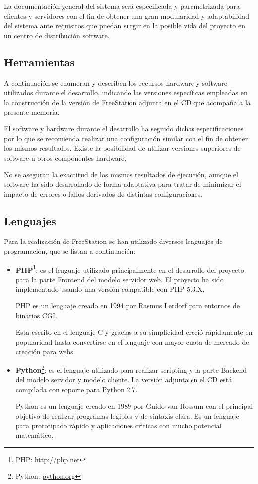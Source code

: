 La documentación general del sistema será especificada y parametrizada para
clientes y servidores con el fin de obtener una gran modularidad y
adaptabilidad del sistema ante requisitos que puedan surgir en la posible vida
del proyecto en un centro de distribución software.

\newpage

\subsection{Herramientas}

A continuación se enumeran y describen los recursos hardware y software
utilizados durante el desarrollo, indicando las versiones específicas
empleadas en la construcción de la versión de FreeStation adjunta en el CD que
acompaña a la presente memoria.

El software y hardware durante el desarrollo ha seguido dichas especificaciones
por lo que se recomienda realizar una configuración similar con el fin de
obtener los mismos resultados. Existe la posibilidad de utilizar versiones
superiores de software u otros componentes hardware.

No se aseguran la exactitud de los mismos resultados de ejecución, aunque el
software ha sido desarrollado de forma adaptativa para tratar de minimizar
el impacto de errores o fallos derivados de distintas configuraciones.

\subsection{Lenguajes}

Para la realización de FreeStation se han utilizado diversos lenguajes de
programación, que se listan a continuación:

\begin{itemize}
\item \textbf{\acs{PHP}\label{acro:PHP}}\footnote{PHP:
\url{http://php.net}\label{ftn:PHP}}:
es el lenguaje utilizado principalmente en el desarrollo del proyecto para la parte Frontend del modelo servidor web.
El proyecto ha sido implementado usando una versión compatible con
PHP 5.3.X.

PHP es un lenguaje creado en 1994 por Rasmus Lerdorf para entornos de
binarios \acs{CGI}\label{acro:CGI}.

Esta escrito en el lenguaje C y gracias a su simplicidad creció rápidamente en
popularidad hasta convertirse en el lenguaje con mayor cuota de mercado de
creación para webs.

\item \textbf{Python}\footnote{Python: \url{python.org}\label{ftn:Python}}:
es el lenguaje utilizado para realizar scripting y la parte Backend del modelo servidor y modelo cliente. La versión
adjunta en el CD está compilada con soporte para Python 2.7.

Python es un lenguaje creado en 1989 por Guido van Rossum con el principal
objetivo de realizar programas legibles y de sintaxis clara. Es un lenguaje
para prototipado rápido y aplicaciones críticas con mucho potencial
matemático.

\end{itemize}

